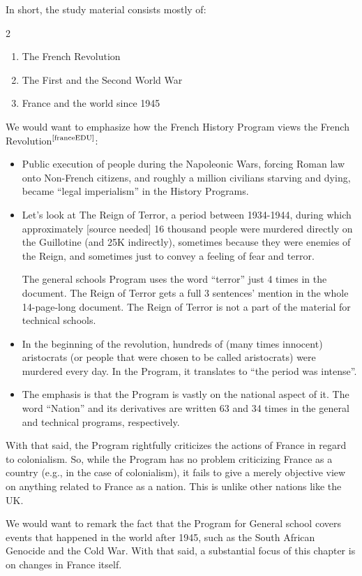 \documentclass[12pt]{article}
\newcommand\mc[1]  {$^{\text{\cite{#1}}}$}
\begin{document}
	In short, the study material consists mostly of: 
	\begin{multicols}{2}
		\begin{enumerate}
			\item The French Revolution
			\item The First and the Second World War
			\item France and the world since 1945
		\end{enumerate}
	\end{multicols}
	We would want to emphasize how the French History Program views the French Revolution\mc{franceEDU}: 
	\begin{itemize}
		\item Public execution of people during the Napoleonic Wars, forcing Roman law onto Non-French citizens, and roughly a million civilians starving and dying, became ``legal imperialism'' in the History Programs. 
		\item Let's look at The Reign of Terror, a period between 1934-1944, during which approximately [source needed] 16 thousand people were murdered directly on the Guillotine (and 25K indirectly), sometimes because they were enemies of the Reign, and sometimes just to convey a feeling of fear and terror. 
		
		The general schools Program uses the word ``terror'' just 4 times in the document. The Reign of Terror gets a full 3 sentences' mention in the whole 14-page-long document. The Reign of Terror is not a part of the material for technical schools. 
		
		\item In the beginning of the revolution, hundreds of (many times innocent) aristocrats (or people that were chosen to be called aristocrats) were murdered every day. In the Program, it translates to ``the period was intense''. 
		\item The emphasis is that the Program is vastly on the national aspect of it. The word ``Nation'' and its derivatives are written 63 and 34 times in the general and technical programs, respectively. 
	\end{itemize}
	With that said, the Program rightfully criticizes the actions of France in regard to colonialism. So, while the Program has no problem criticizing France as a country (e.g., in the case of colonialism), it fails to give a merely objective view on anything related to France as a nation. This is unlike other nations like the UK. 
	
	We would want to remark the fact that the Program for General school covers events that happened in the world after 1945, such as the South African Genocide and the Cold War. With that said, a substantial focus of this chapter is on changes in France itself. 
	
\end{document}
